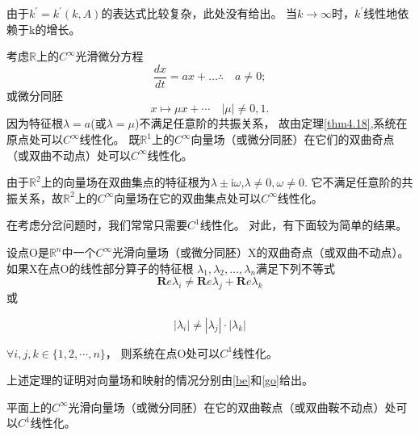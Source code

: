 \begin{note}
  由于$k ^ { \prime } = k ^ { \prime } ( k , A )$的表达式比较复杂，此处没有给出。
  当\(k\to \infty\)时，\(k^\prime\)线性地依赖于k的增长。
\end{note}

\begin{example}
  考虑\(\mathbb{R}\)上的\(C^\infty\)光滑微分方程
  \[
  \frac { d x } { d t } = a x + \dots \therefore \quad a \neq 0;
\]
或微分同胚
\[
x \mapsto \mu x + \cdots \quad | \mu | \neq 0,1.
\]
因为特征根\(\lambda=a\)(或\(\lambda=\mu\))不满足任意阶的共振关系，
故由定理\ref{thm4.18},系统在原点处可以\(C^\infty\)线性化。
既\(\mathbb{R}^1\)上的\(C^\infty\)向量场（或微分同胚）在它们的双曲奇点（或双曲不动点）处可以\(C^\infty\)线性化。
\end{example}

\begin{example}
  由于\(\mathbb{R}^2\)上的向量场在双曲集点的特征根为$\lambda \pm \mathrm { i } \omega$,\(\lambda \neq 0,\omega \neq 0\).
  它不满足任意阶的共振关系，故\(\mathbb{R}^2\)上的\(C^\infty\)向量场在它的双曲集点处可以\(C^\infty\)线性化。  
\end{example}
在考虑分岔问题时，我们常常只需要\(C^1\)线性化。
对此，有下面较为简单的结果。

\begin{theorem}
  设点O是\(\mathbb{R}^n\)中一个\(C^\infty\)光滑向量场（或微分同胚）X的双曲奇点（或双曲不动点）。
  如果X在点O的线性部分算子的特征根
  $\lambda_{ 1 } , \lambda_{ 2 } , \dots , \lambda_{ n }$满足下列不等式
  \begin{equation}
    \mathbf{ R } e \lambda_{ i } \neq \mathbf{ R } e \lambda _ { j } + \mathbf{ R } e \lambda _ { k }
  \end{equation}或

  \begin{equation}
    \left| \lambda _ { i } \right| \neq \left| \lambda _ { j } \right| \cdot \left| \lambda_ { k } \right|
    \label{eq:1.4.30}
  \end{equation}
  
  $\forall i , j , k \in \{ 1,2 , \cdots , n \}$，
  则系统在点O处可以\(C^1\)线性化。
\end{theorem}


上述定理的证明对向量场和映射的情况分别由\ref{be}和\ref{go}给出。

\begin{example}
平面上的\(C^\infty\)光滑向量场（或微分同胚）在它的双曲鞍点（或双曲鞍不动点）处可以\(C^1\)线性化。
\end{example}

